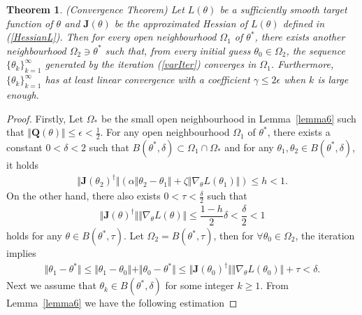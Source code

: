 \documentclass[a4paper, 11pt]{article}
\numberwithin{equation}{section}
\newtheorem{theorem}{\textbf{Theorem}}
\begin{document}
\begin{theorem}(Convergence Theorem)
Let $L(\theta)$ be a sufficiently smooth target function of $\theta$ and $\boldsymbol{J} (\theta)$ be the approximated Hessian of $L(\theta)$ defined in (\ref{HessianL}). Then for every open neighbourhood $\Omega_1$ of $\theta^*$, there exists another  neighbourhood $\Omega_2 \ni \theta^*$ such that, from every initial guess $\theta_0 \in \Omega_2$, the sequence $\lbrace \theta_k \rbrace_{k=1}^{\infty}$ generated by the iteration (\ref{varIter}) converges in  $\Omega_1$. Furthermore, $\lbrace \theta_k \rbrace_{k=1}^{\infty}$  has at least linear convergence with a coefficient $\gamma \leq 2\epsilon$ when $k$ is large enough.
\end{theorem}

\begin{proof}
Firstly, Let $\Omega_*$ be the small open neighbourhood in Lemma~\ref{lemma6} such that $\Vert \boldsymbol{Q} (\theta) \Vert \leq \epsilon < \frac{1}{2}$. For any open neighbourhood $\Omega_1$ of $\theta^*$, there exists a constant $0<\delta<2$ such that $B(\theta^*, \delta) \subset \Omega_1 \cap \Omega_*$ and for  any $\theta_1, \theta_2 \in B(\theta^*, \delta) $, it holds
\begin{align}
\Vert \boldsymbol{J} (\theta_2)^{\dagger} \Vert \left( \alpha \Vert \theta_2 - \theta_1 \Vert + \zeta \Vert \nabla_{\theta} L (\theta_1)  \Vert \right) \leq h < 1.
\end{align}
On the other hand, there also exists $0<\tau<\frac{\delta}{2}$ such that
\begin{align}
 \Vert \boldsymbol{J} (\theta)^{\dagger} \Vert \Vert\nabla_{\theta}L(\theta)\Vert \leq \dfrac{1-h}{2} \delta  < \dfrac{\delta}{2} <1
\end{align}
holds for any $\theta \in B(\theta^*, \tau)$. Let $\Omega_2 = B(\theta^*, \tau)$, then for $\forall \theta_0 \in \Omega_2$, the iteration implies 
\begin{align}
\Vert \theta_1 - \theta^* \Vert \leq \Vert \theta_1 - \theta_0 \Vert + \Vert \theta_0 - \theta^* \Vert \leq  \Vert \boldsymbol{J} (\theta_0)^{\dagger} \Vert \Vert\nabla_{\theta}L(\theta_0)\Vert + \tau < \delta.
\end{align}
Next we assume that $\theta_k \in B(\theta^*, \delta)$ for some integer $k \geq 1$. From Lemma~\ref{lemma6} we have the following estimation 


\end{proof}
\end{document}
